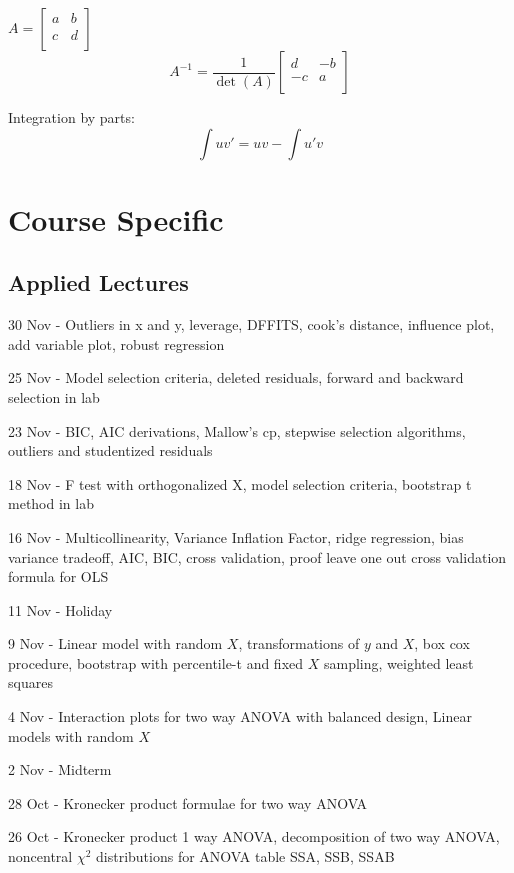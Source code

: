 \documentclass[10pt, twocolumn]{article}
\begin{document}
$
    A = 
    [\begin{smallmatrix}
        a & b \\
        c & d \\
    \end{smallmatrix}]
$
\[
    A^{-1} = 
    \frac{1}{\det (A)}
    \begin{bmatrix}
        d & -b \\
        -c & a \\
    \end{bmatrix}
\]

Integration by parts:
\[
    \int uv' = uv - \int u'v
\]

\section{Course Specific}

\subsection{Applied Lectures}

30 Nov - Outliers in x and y, leverage, DFFITS, cook's distance, influence
plot, add variable plot, robust regression

25 Nov - Model selection criteria, deleted residuals, forward and backward
selection in lab

23 Nov - BIC, AIC derivations, Mallow's cp, stepwise selection algorithms,
outliers and studentized residuals

18 Nov - F test with orthogonalized X, model selection criteria,
bootstrap t method in lab

16 Nov - Multicollinearity, Variance Inflation Factor,
ridge regression, bias variance tradeoff, AIC, BIC, cross validation, proof leave
one out cross validation formula for OLS 

11 Nov - Holiday

9 Nov - Linear model with random $X$, transformations of $y$ and $X$, box
cox procedure, bootstrap with percentile-t and fixed $X$ sampling, weighted
least squares

4 Nov - Interaction plots for two way ANOVA with balanced design, Linear
models with random $X$

2 Nov - Midterm

28 Oct - Kronecker product formulae for two way ANOVA

26 Oct - Kronecker product 1 way ANOVA, decomposition of two way ANOVA,
noncentral $\chi^2$ distributions for ANOVA table SSA, SSB, SSAB
\end{document}
